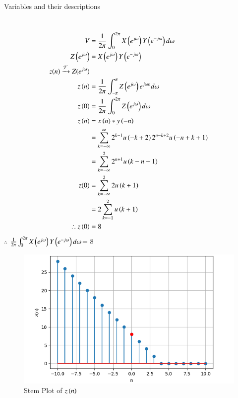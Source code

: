 \documentclass[journal,12pt,twocolumn]{IEEEtran}
\theoremstyle{remark}
\begin{document}
\solution\\
\begin{table}[h]
         \label{tab:table}
         
         \caption{Variables and their descriptions}
     \end{table}\\
\begin{align}
    V&=\frac{1}{2\pi}\int_{0}^{2\pi} X\left(e^{j\omega}\right) Y\left(e^{-j\omega}\right) d \omega\\
     Z\left(e^{j\omega}\right)&= X\left(e^{j\omega}\right) Y\left(e^{-j \omega}\right)\\
           z(n)\xrightarrow{\mathcal{F}} Z(e^{j\omega})\\
           z\left(n\right)&=\frac{1}{2\pi}\int_{-\pi}^{\pi} Z\left(e^{j\omega}\right) e^{j\omega n} d\omega\\
      z\left(0\right)&=\frac{1}{2\pi}\int_{0}^{2\pi} Z\left(e^{j\omega}\right) d \omega\\
   z\left( n\right)&= x\left(n\right) * y\left(-n\right)\\
   &=\sum_{k=-\infty}^{\infty} 2^{k-1} u\left(-k+2\right) 2^{n-k+2} u\left(-n+k+1\right)\\
   &=\sum_{k=-\infty}^{2} 2^{n+1} u\left(k-n+1\right)\\
   z(0)&=\sum_{k=-\infty}^{2} 2 u\left(k+1\right)\\
   &=2\sum_{k=-1}^{2}u\left(k+1\right)\\
  \therefore z\left(0\right) &=8
\end{align}
$\therefore$ $\frac{1}{2\pi}\int_{0}^{2\pi} X\left(e^{j\omega}\right) Y\left(e^{-j\omega}\right) d \omega$= $8$
\renewcommand{\thefigure}{\theenumi}
 \renewcommand{\thetable}{\theenumi}
\begin{figure}[h]
  
  \includegraphics[width=\columnwidth]{figs/Figure_1.png}
  \caption{Stem Plot of $z\left(n\right)$}
\end{figure}
\end{document}
